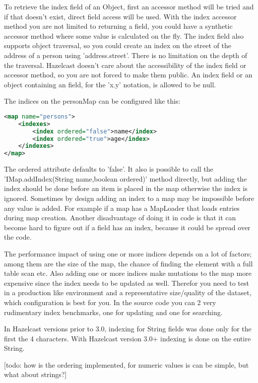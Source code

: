 To retrieve the index field of an Object, first an accessor method will be tried and if that doesn't exist, direct field access will be used. With the index accessor method you are not limited to returning a field, you could have a synthetic accessor method where some value is calculated on the fly. The index field also supports object traversal, so you could create an index on the street of the address of a person using 'address.street'. There is no limitation on the depth of the traversal. Hazelcast doesn't care about the accessibility of the index field or accessor method, so you are not forced to make them public. An index field or an object containing an field, for the 'x.y' notation, is allowed to be null.

The indices on the personMap can be configured like this:
\begin{lstlisting}[language=xml]
<map name="persons">
    <indexes>
        <index ordered="false">name</index>
        <index ordered="true">age</index>
    </indexes>
</map>
\end{lstlisting}
The ordered attribute defaults to 'false'. It also is possible to call the 'IMap.addIndex(String name,boolean ordered)' method directly, but adding the index should be done before an item is placed in the map otherwise the index is ignored. Sometimes by design adding an index to a map may be impossible before any value is added. For example if a map has a MapLoader that loads entries during map creation. Another disadvantage of doing it in code is that it can become hard to figure out if a field has an index, because it could be spread over the code.

The performance impact of using one or more indices depends on a lot of factors; among them are the size of the map, the chance of finding the element with a full table scan etc. Also adding one or more indices make mutations to the map more expensive since the index needs to be updated as well. Therefor you need to test in a production like environment and a representative size/quality of the dataset, which configuration is best for you. In the source code you can 2 very rudimentary index benchmarks, one for updating and one for searching. 

In Hazelcast versions prior to 3.0, indexing for String fields was done only for the first the 4 characters. With Hazelcast version 3.0+ indexing is done on the entire String.

[todo: how is the ordering implemented, for numeric values is can be simple, but what about strings?]

